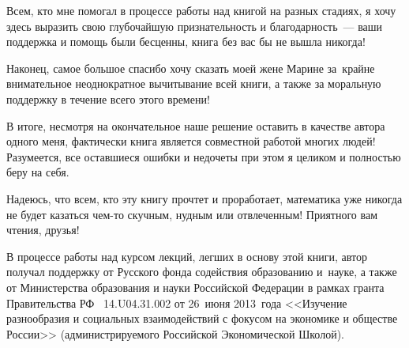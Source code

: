 {Всем, кто мне помогал в процессе работы над книгой на разных стадиях, я хочу
здесь выразить свою глубочайшую признательность и благодарность~--- ваши
поддержка и помощь были бесценны, книга без вас бы не вышла никогда!


Наконец, самое большое спасибо хочу сказать моей жене Марине за~крайне внимательное неоднократное
вычитывание всей книги, а также за моральную поддержку в течение всего этого времени!

В итоге, несмотря на окончательное наше решение оставить в качестве автора одного
меня, фактически книга является совместной работой многих людей! Разумеется, все
оставшиеся ошибки и недочеты при этом я целиком и полностью беру на себя.

Надеюсь, что всем, кто эту книгу прочтет и проработает, математика уже никогда не
будет казаться чем-то скучным, нудным или отвлеченным! Приятного вам чтения, друзья!

В процессе работы над курсом лекций, легших в основу этой книги, автор
получал поддержку от Русского фонда содействия образованию и~науке,
а также от Министерства образования и науки Российской Федерации в
рамках гранта Правительства РФ \No~14.U04.31.002 от 26~июня 2013~года
<<Изучение разнообразия и социальных взаимодействий с фокусом на
экономике и обществе России>> (администрируемого Российской
Экономической Школой).



}
